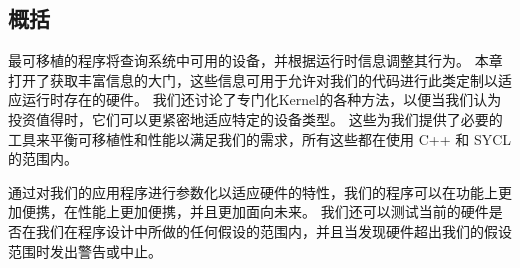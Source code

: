 \subsection{概括}
最可移植的程序将查询系统中可用的设备，并根据运行时信息调整其行为。 
本章打开了获取丰富信息的大门，这些信息可用于允许对我们的代码进行此类定制以适应运行时存在的硬件。 
我们还讨论了专门化Kernel的各种方法，以便当我们认为投资值得时，它们可以更紧密地适应特定的设备类型。 
这些为我们提供了必要的工具来平衡可移植性和性能以满足我们的需求，所有这些都在使用 C++ 和 SYCL 的范围内。

通过对我们的应用程序进行参数化以适应硬件的特性，我们的程序可以在功能上更加便携，在性能上更加便携，并且更加面向未来。 
我们还可以测试当前的硬件是否在我们在程序设计中所做的任何假设的范围内，并且当发现硬件超出我们的假设范围时发出警告或中止。